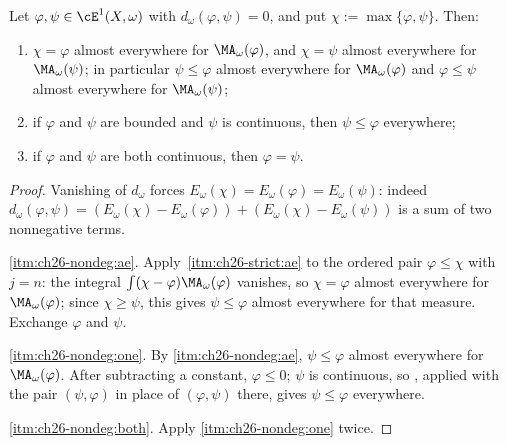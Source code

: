 \begin{corollary}
\label{cor:ch26-gauge-nondegenerate}
Let \(\varphi,\psi\in\cE^1(X,\omega)\) with
\(d_\omega(\varphi,\psi)=0\), and put \(\chi:=\max\{\varphi,\psi\}\).  Then:
\begin{enumerate}
\item\label{itm:ch26-nondeg:ae}
 \(\chi=\varphi\) almost everywhere for \(\MA_\omega(\varphi)\), and
 \(\chi=\psi\) almost everywhere for \(\MA_\omega(\psi)\); in particular
 \(\psi\leq\varphi\) almost everywhere for \(\MA_\omega(\varphi)\) and
 \(\varphi\leq\psi\) almost everywhere for \(\MA_\omega(\psi)\);
\item\label{itm:ch26-nondeg:one}
 if \(\varphi\) and \(\psi\) are bounded and \(\psi\) is continuous, then
 \(\psi\leq\varphi\) everywhere;
\item\label{itm:ch26-nondeg:both}
 if \(\varphi\) and \(\psi\) are both continuous, then \(\varphi=\psi\).
\end{enumerate}
\end{corollary}

\begin{proof}
Vanishing of \(d_\omega\) forces
\(E_\omega(\chi)=E_\omega(\varphi)=E_\omega(\psi)\): indeed
\(d_\omega(\varphi,\psi)=(E_\omega(\chi)-E_\omega(\varphi))
+(E_\omega(\chi)-E_\omega(\psi))\) is a sum of two nonnegative terms.

\cref{itm:ch26-nondeg:ae}.  Apply
\,\cref{itm:ch26-strict:ae} to the ordered
pair \(\varphi\leq\chi\) with \(j=n\): the integral
\(\int(\chi-\varphi)\MA_\omega(\varphi)\) vanishes, so \(\chi=\varphi\)
almost everywhere for \(\MA_\omega(\varphi)\); since \(\chi\geq\psi\), this
gives \(\psi\leq\varphi\) almost everywhere for that measure.  Exchange
\(\varphi\) and \(\psi\).

\cref{itm:ch26-nondeg:one}.  By \cref{itm:ch26-nondeg:ae},
\(\psi\leq\varphi\) almost everywhere for \(\MA_\omega(\varphi)\).  After
subtracting a constant, \(\varphi\leq0\); \(\psi\) is continuous, so
, applied with the pair
\((\psi,\varphi)\) in place of \((\varphi,\psi)\) there, gives
\(\psi\leq\varphi\) everywhere.

\cref{itm:ch26-nondeg:both}.  Apply \cref{itm:ch26-nondeg:one} twice.
\end{proof}

